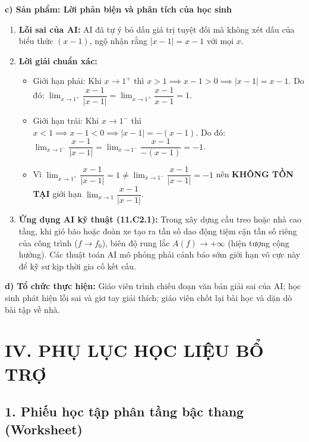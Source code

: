 \documentclass[12pt, a4paper]{article}
\begin{document}
\noindent \textbf{c) Sản phẩm: Lời phản biện và phân tích của học sinh}
\begin{enumerate}[leftmargin=0.6cm]
    \item \textbf{Lỗi sai của AI:} AI đã tự ý bỏ dấu giá trị tuyệt đối mà không xét dấu của biểu thức $(x - 1)$, ngộ nhận rằng $|x - 1| = x - 1$ với mọi $x$.
    \item \textbf{Lời giải chuẩn xác:}
    \begin{itemize}
        \item Giới hạn phải: Khi $x \to 1^+$ thì $x > 1 \implies x - 1 > 0 \implies |x - 1| = x - 1$.
        Do đó: $\lim_{x \to 1^+} \dfrac{x - 1}{|x - 1|} = \lim_{x \to 1^+} \dfrac{x - 1}{x - 1} = 1$.
        \item Giới hạn trái: Khi $x \to 1^-$ thì $x < 1 \implies x - 1 < 0 \implies |x - 1| = -(x - 1)$.
        Do đó: $\lim_{x \to 1^-} \dfrac{x - 1}{|x - 1|} = \lim_{x \to 1^-} \dfrac{x - 1}{-(x - 1)} = -1$.
        \item Vì $\lim_{x \to 1^+} \dfrac{x - 1}{|x - 1|} = 1 \neq \lim_{x \to 1^-} \dfrac{x - 1}{|x - 1|} = -1$ nên \textbf{KHÔNG TỒN TẠI} giới hạn $\lim_{x \to 1} \dfrac{x - 1}{|x - 1|}$.
    \end{itemize}
    \item \textbf{Ứng dụng AI kỹ thuật (11.C2.1):} Trong xây dựng cầu treo hoặc nhà cao tầng, khi gió bão hoặc đoàn xe tạo ra tần số dao động tiệm cận tần số riêng của công trình ($f \to f_0$), biên độ rung lắc $A(f) \to +\infty$ (hiện tượng cộng hưởng). Các thuật toán AI mô phỏng phải cảnh báo sớm giới hạn vô cực này để kỹ sư kịp thời gia cố kết cấu.
\end{enumerate}

\noindent \textbf{d) Tổ chức thực hiện:}
Giáo viên trình chiếu đoạn văn bản giải sai của AI; học sinh phát hiện lỗi sai và giơ tay giải thích; giáo viên chốt lại bài học và dặn dò bài tập về nhà.

\section*{IV. PHỤ LỤC HỌC LIỆU BỔ TRỢ}

\subsection*{1. Phiếu học tập phân tầng bậc thang (Worksheet)}
\end{document}
